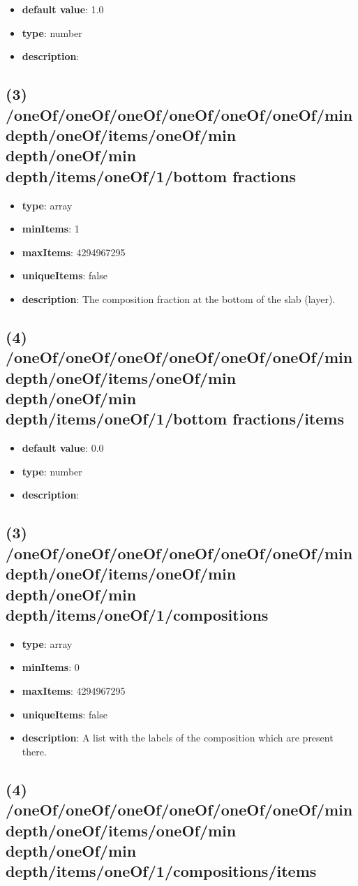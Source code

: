 \begin{itemize}[leftmargin=4em]\item {\bf default value}: 1.0
\item {\bf type}: number
\item {\bf description}: 
\end{itemize}\subsection{(3) /oneOf/oneOf/oneOf/oneOf/oneOf/oneOf/min depth/oneOf/items/oneOf/min depth/oneOf/min depth/items/oneOf/1/bottom fractions}
\begin{itemize}[leftmargin=3em]\item {\bf type}: array
\item {\bf minItems}: 1
\item {\bf maxItems}: 4294967295
\item {\bf uniqueItems}: false
\item {\bf description}: The composition fraction at the bottom of the slab (layer).
\end{itemize}\subsection{(4) /oneOf/oneOf/oneOf/oneOf/oneOf/oneOf/min depth/oneOf/items/oneOf/min depth/oneOf/min depth/items/oneOf/1/bottom fractions/items}
\begin{itemize}[leftmargin=4em]\item {\bf default value}: 0.0
\item {\bf type}: number
\item {\bf description}: 
\end{itemize}\subsection{(3) /oneOf/oneOf/oneOf/oneOf/oneOf/oneOf/min depth/oneOf/items/oneOf/min depth/oneOf/min depth/items/oneOf/1/compositions}
\begin{itemize}[leftmargin=3em]\item {\bf type}: array
\item {\bf minItems}: 0
\item {\bf maxItems}: 4294967295
\item {\bf uniqueItems}: false
\item {\bf description}: A list with the labels of the composition which are present there.
\end{itemize}\subsection{(4) /oneOf/oneOf/oneOf/oneOf/oneOf/oneOf/min depth/oneOf/items/oneOf/min depth/oneOf/min depth/items/oneOf/1/compositions/items}
